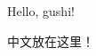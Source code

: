 \documentclass[a4paper,12pt]{article}
\begin{document}
Hello, gushi!

中文放在这里！

\nocite{*}


\end{document}
